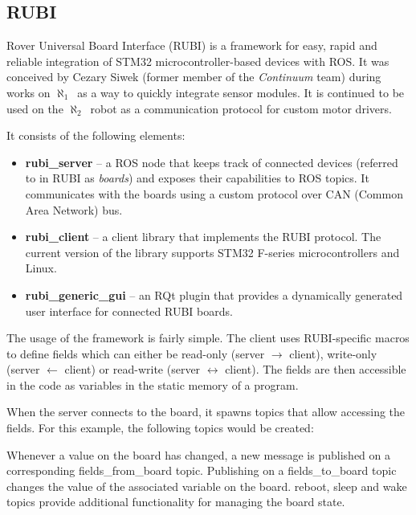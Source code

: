\documentclass[english,inz,shortabstract]{iithesis}
\newcommand{\oldrovername}{$\aleph_1$\ }
\newcommand{\rovername}{$\aleph_2$\ }
\begin{document}
    \subsection{RUBI}
    Rover Universal Board Interface (RUBI) is a framework for easy, rapid and reliable integration of STM32 microcontroller-based devices with ROS. It was conceived by Cezary Siwek (former member of the \textit{Continuum} team) during works on \oldrovername as a way to quickly integrate sensor modules. It is continued to be used on the \rovername robot as a communication protocol for custom motor drivers.

    It consists of the following elements:
    \begin{itemize}
        \item \textbf{rubi\_server} -- a ROS node that keeps track of connected devices (referred to in RUBI as \textit{boards}) and exposes their capabilities to ROS topics. It communicates with the boards using a custom protocol over CAN (Common Area Network) bus. 
        \item \textbf{rubi\_client} -- a client library that implements the RUBI protocol. The current version of the library supports STM32 F-series microcontrollers and Linux.
        \item \textbf{rubi\_generic\_gui} -- an RQt plugin that provides a dynamically generated user interface for connected RUBI boards.

    \end{itemize}

    The usage of the framework is fairly simple. The client uses RUBI-specific macros to define fields which can either be read-only (server $\rightarrow$ client), write-only (server $\leftarrow$ client) or read-write (server $\leftrightarrow$ client). The fields are then accessible in the code as variables in the static memory of a program.

    

    When the server connects to the board, it spawns topics that allow accessing the fields. For this example, the following topics would be created:

    

    Whenever a value on the board has changed, a new message is published on a corresponding \textsf{fields\_from\_board} topic. Publishing on a \textsf{fields\_to\_board} topic changes the value of the associated variable on the board. \textsf{reboot}, \textsf{sleep} and \textsf{wake} topics provide additional functionality for managing the board state.
\end{document}
